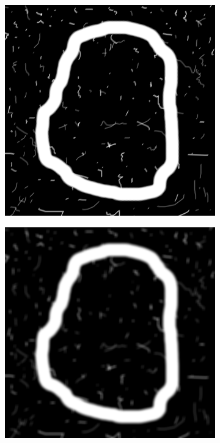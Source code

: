 \begin{figure}[h!]
	\centering
	\begin{subfigure}[b]{0.4\linewidth}
		\includegraphics[width=\linewidth]{myfigure/p10/noisy_stroke.png}
		\caption{}
		\label{fig:noisystroke}
	\end{subfigure}
	\begin{subfigure}[b]{0.4\linewidth}
    	\includegraphics[width=\linewidth]{myfigure/p10/10_mean.png}

\end{subfigure}
\end{figure}
